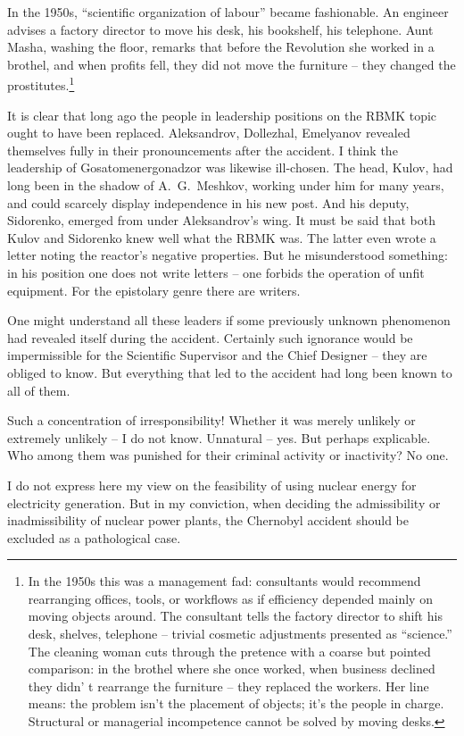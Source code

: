 \documentclass[openright]{bookest}
\begin{document}
In the 1950s, ``scientific organization of labour'' became fashionable. An engineer advises a factory director to move his desk, his bookshelf, his telephone. Aunt Masha, washing the floor, remarks that before the Revolution she worked in a brothel, and when profits fell, they did not move the furniture -- they changed the prostitutes.\footnote{In the 1950s this was a management fad: consultants would recommend rearranging offices, tools, or workflows as if efficiency depended mainly on moving objects around. The consultant tells the factory director to shift his desk, shelves, telephone -- trivial cosmetic adjustments presented as ``science.'' The cleaning woman cuts through the pretence with a coarse but pointed comparison: in the brothel where she once worked, when business declined they didn' t rearrange the furniture -- they replaced the workers. Her line means: the problem isn't the placement of objects; it's the people in charge. Structural or managerial incompetence cannot be solved by moving desks.}

It is clear that long ago the people in leadership positions on the RBMK topic ought to have been replaced. Aleksandrov, Dollezhal, Emelyanov revealed themselves fully in their pronouncements after the accident. I think the leadership of Gosatomenergonadzor was likewise ill-chosen. The head, Kulov, had long been in the shadow of A.~G.~Meshkov, working under him for many years, and could scarcely display independence in his new post. And his deputy, Sidorenko, emerged from under Aleksandrov's wing. It must be said that both Kulov and Sidorenko knew well what the RBMK was. The latter even wrote a letter noting the reactor's negative properties. But he misunderstood something: in his position one does not write letters -- one forbids the operation of unfit equipment. For the epistolary genre there are writers.

One might understand all these leaders if some previously unknown phenomenon had revealed itself during the accident. Certainly such ignorance would be impermissible for the Scientific Supervisor and the Chief Designer -- they are obliged to know. But everything that led to the accident had long been known to all of them.

Such a concentration of irresponsibility! Whether it was merely unlikely or extremely unlikely -- I do not know. Unnatural -- yes. But perhaps explicable. Who among them was punished for their criminal activity or inactivity? No one.

I do not express here my view on the feasibility of using nuclear energy for electricity generation. But in my conviction, when deciding the admissibility or inadmissibility of nuclear power plants, the Chernobyl accident should be excluded as a pathological case.
\end{document}
